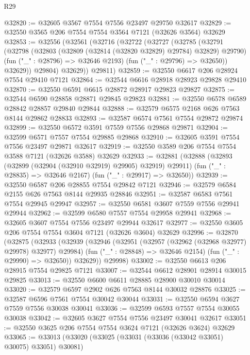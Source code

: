 \begin{lexlean}{R29}
\begin{coremodule}
@32820 := @32605 @3567 @7554 @7556 @23497 @29750 @32617
@32829 := @32550 @3565 @206 @7554 @7554 @3564 @7121 (@32626 @3564) @32629
@32853 := @32556
    (@32561
      (@32716
        (@32722
          (@32727
            (@32785
              (@32791
                (@32798
                  (@32803 (@32809 (@32814 (@32820 @32829) @29784) @32829) @29790)
                  (fun ("_" : @28796) => @32646 @2193)
                  (fun ("_" : @29796) => @32650))
                @32629))
            @29804)
          @32629))
      @29811)
@32859 := @32550 @6617 @206 @28924 @7554 @29410 @7121
@32864 := @32544 @6616 @28918 @28923 @29828 @29410
@32870 := @32550 @6591 @6615 @28872 @28917 @29823 @29827
@32875 := @32544 @6590 @28858 @28871 @29845 @29823
@32881 := @32550 @6578 @6589 @28842 @28857 @29840 @29844
@32888 := @32579 @6575 @2168 @626 @7563 @8144 @29862 @28833
@32893 := @32587 @6574 @7561 @7554 @29872 @29874
@32899 := @32550 @6572 @3591 @7559 @7556 @29868 @29871
@32904 := @32599 @6571 @7557 @7554 @29885 @29868
@32910 := @32605 @3591 @7554 @7556 @23497 @29871 @32617
@32919 := @32550 @3589 @206 @7554 @7554 @3588 @7121 (@32626 @3588) @32629
@32933 := @32881
    (@32888
      (@32893 (@32899 (@32904 (@32910 @32919) @29905) @32919) @29911)
      (fun ("_" : @28835) => @32646 @2167)
      (fun ("_" : @29917) => @32650))
@32939 := @32550 @6587 @206 @28855 @7554 @29842 @7121
@32946 := @32579 @6584 @2155 @626 @7563 @8144 @29935 @28846
@32951 := @32587 @6583 @7561 @7554 @29945 @29947
@32957 := @32550 @6581 @3607 @7559 @7556 @29941 @29944
@32962 := @32599 @6580 @7557 @7554 @29958 @29941
@32968 := @32605 @3607 @7554 @7556 @23497 @29944 @32617
@32977 := @32550 @3605 @206 @7554 @7554 @3604 @7121 (@32626 @3604) @32629
@32996 := @32870
    (@32875
      (@32933
        (@32939
          (@32946
            (@32951 (@32957 (@32962 (@32968 @32977) @29978) @32977) @29984)
            (fun ("_" : @28848) => @32646 @2154)
            (fun ("_" : @29990) => @32650))
          @32629))
      @29998)
@33002 := @32550 @6613 @206 @28915 @7554 @29825 @7121
@33007 := @32544 @6612 @28901 @28914 @30015 @29825
@33013 := @32550 @6600 @6611 @28885 @28900 @30010 @30014
@33020 := @32579 @6597 @2902 @626 @7563 @8144 @30032 @28876
@33025 := @32587 @6596 @7561 @7554 @30042 @30044
@33031 := @32550 @6594 @3627 @7559 @7556 @30038 @30041
@33036 := @32599 @6593 @7557 @7554 @30055 @30038
@33042 := @32605 @3627 @7554 @7556 @23497 @30041 @32617
@33051 := @32550 @3625 @206 @7554 @7554 @3624 @7121 (@32626 @3624) @32629
@33065 := @33013
    (@33020
      (@33025 (@33031 (@33036 (@33042 @33051) @30075) @33051) @30081)

\end{coremodule}
\end{lexlean}
